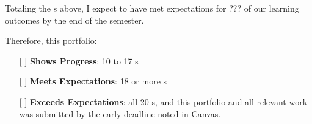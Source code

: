 \documentclass{article}
\begin{document}
Totaling the \checkmark{}s above, I expect to have met expectations for
???
of our learning outcomes by the end of the semester.

Therefore, this portfolio:

\begin{itemize}
\item[[ ]] \textbf{Shows Progress}: 10 to 17 \checkmark{}s

\item[[ ]] \textbf{Meets Expectations}: 18 or more \checkmark{}s

\item[[ ]] \textbf{Exceeds Expectations}: all 20 \checkmark{}s,
and this portfolio and all relevant work was submitted by the
early deadline noted in Canvas.

\end{itemize}


% 
% 
\end{document}
